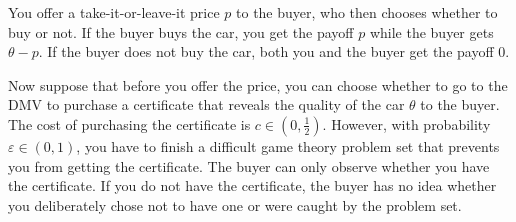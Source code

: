 \documentclass[11pt]{article}
\begin{document}
You offer a take-it-or-leave-it price $p$ to the buyer, who then chooses whether to buy or not. If the buyer buys the car, you get the payoff $p$ while the buyer gets $\theta - p$. If the buyer does not buy the car, both you and the buyer get the payoff 0.

Now suppose that before you offer the price, you can choose whether to go to the DMV to purchase a certificate that reveals the quality of the car $\theta$ to the buyer. The cost of purchasing the certificate is $c \in \left(0, \frac{1}{2}\right)$. However, with probability $\varepsilon \in (0, 1)$, you have to finish a difficult game theory problem set that prevents you from getting the certificate. The buyer can only observe whether you have the certificate. If you do not have the certificate, the buyer has no idea whether you deliberately chose not to have one or were caught by the problem set.
\end{document}
